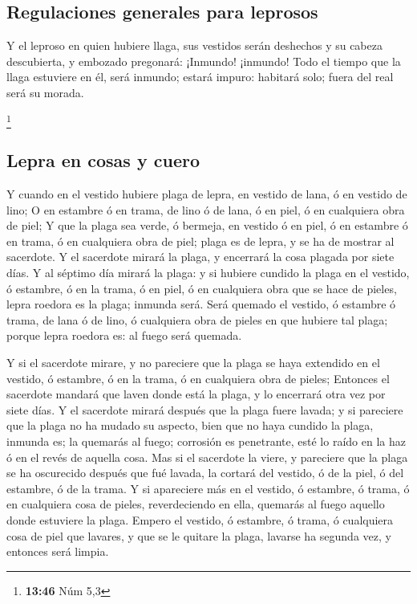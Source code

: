 \hypertarget{regulaciones-generales-para-leprosos}{%
\subsection{Regulaciones generales para
leprosos}\label{regulaciones-generales-para-leprosos}}

 Y el leproso en quien hubiere llaga, sus vestidos serán
deshechos y su cabeza descubierta, y embozado pregonará: ¡Inmundo!
¡inmundo!  Todo el tiempo que la llaga estuviere en él,
será inmundo; estará impuro: habitará solo; fuera del real será su
morada.

\footnote{\textbf{13:46} Núm 5,3}

\hypertarget{lepra-en-cosas-y-cuero}{%
\subsection{Lepra en cosas y cuero}\label{lepra-en-cosas-y-cuero}}

 Y cuando en el vestido hubiere plaga de lepra, en
vestido de lana, ó en vestido de lino;  O en estambre ó
en trama, de lino ó de lana, ó en piel, ó en cualquiera obra de piel;
 Y que la plaga sea verde, ó bermeja, en vestido ó en
piel, ó en estambre ó en trama, ó en cualquiera obra de piel; plaga es
de lepra, y se ha de mostrar al sacerdote.  Y el
sacerdote mirará la plaga, y encerrará la cosa plagada por siete días.
 Y al séptimo día mirará la plaga: y si hubiere cundido
la plaga en el vestido, ó estambre, ó en la trama, ó en piel, ó en
cualquiera obra que se hace de pieles, lepra roedora es la plaga;
inmunda será.  Será quemado el vestido, ó estambre ó
trama, de lana ó de lino, ó cualquiera obra de pieles en que hubiere tal
plaga; porque lepra roedora es: al fuego será quemada.

 Y si el sacerdote mirare, y no pareciere que la plaga se
haya extendido en el vestido, ó estambre, ó en la trama, ó en cualquiera
obra de pieles;  Entonces el sacerdote mandará que laven
donde está la plaga, y lo encerrará otra vez por siete días.
 Y el sacerdote mirará después que la plaga fuere lavada;
y si pareciere que la plaga no ha mudado su aspecto, bien que no haya
cundido la plaga, inmunda es; la quemarás al fuego; corrosión es
penetrante, esté lo raído en la haz ó en el revés de aquella cosa.
 Mas si el sacerdote la viere, y pareciere que la plaga
se ha oscurecido después que fué lavada, la cortará del vestido, ó de la
piel, ó del estambre, ó de la trama.  Y si apareciere más
en el vestido, ó estambre, ó trama, ó en cualquiera cosa de pieles,
reverdeciendo en ella, quemarás al fuego aquello donde estuviere la
plaga.  Empero el vestido, ó estambre, ó trama, ó
cualquiera cosa de piel que lavares, y que se le quitare la plaga,
lavarse ha segunda vez, y entonces será limpia.

